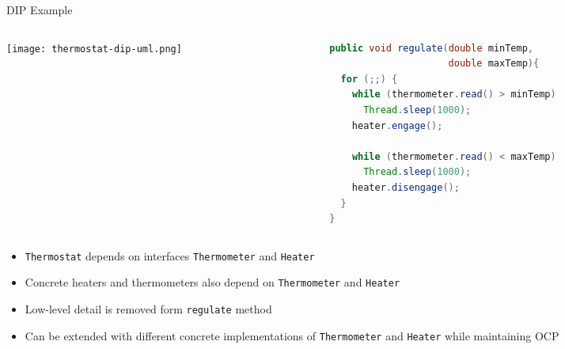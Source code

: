 \documentclass{beamer}
\begin{document}
\begin{frame}[fragile]{DIP Example}
\vspace{-.1in}
\begin{columns}[c]

\begin{column}{2.25in}
\begin{center}
\texttt{[image: thermostat-dip-uml.png]}
\end{center}
\end{column}

\begin{column}{2.75in}
\begin{lstlisting}[language=Java]
public void regulate(double minTemp,
                     double maxTemp){
  for (;;) {
    while (thermometer.read() > minTemp)
      Thread.sleep(1000);
    heater.engage();

    while (thermometer.read() < maxTemp)
      Thread.sleep(1000);
    heater.disengage();
  }
}
\end{lstlisting}
\end{column}
\end{columns}
\vspace{-.1in}
\begin{itemize}
\item {\tt Thermostat} depends on interfaces {\tt Thermometer} and {\tt Heater}
\item Concrete heaters and thermometers also depend on {\tt Thermometer} and {\tt Heater}
\item Low-level detail is removed form {\tt regulate} method
\item Can be extended with different concrete implementations of {\tt Thermometer} and {\tt Heater} while maintaining OCP
\end{itemize}


\end{frame}
\end{document}
